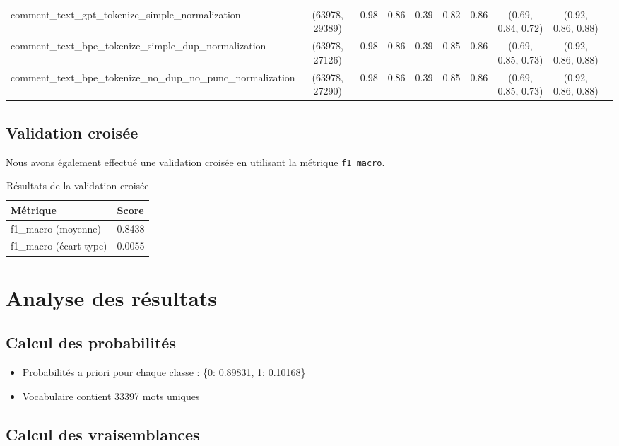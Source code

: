 \begin{table}[htbp]
{\begin{tabular}{@{}lccccccccc@{}}
    comment\_text\_gpt\_tokenize\_simple\_normalization & (63978, 29389) & 0.98 & 0.86 & 0.39 & 0.82 & 0.86 & (0.69, 0.84, 0.72) & (0.92, 0.86, 0.88) \\
    comment\_text\_bpe\_tokenize\_simple\_dup\_normalization & (63978, 27126) & 0.98 & 0.86 & 0.39 & 0.85 & 0.86 & (0.69, 0.85, 0.73) & (0.92, 0.86, 0.88) \\
    comment\_text\_bpe\_tokenize\_no\_dup\_no\_punc\_normalization & (63978, 27290) & 0.98 & 0.86 & 0.39 & 0.85 & 0.86 & (0.69, 0.85, 0.73) & (0.92, 0.86, 0.88) \\
    \bottomrule
    \end{tabular}%
    }
    \end{table}


\subsection{Validation croisée}

Nous avons également effectué une validation croisée en utilisant la métrique \texttt{f1\_macro}.

\begin{table}[h]
    \centering
    \begin{tabular}{|l|l|}
    \hline
    \textbf{Métrique} & \textbf{Score} \\ \hline
    f1\_macro (moyenne) & 0.8438 \\ \hline
    f1\_macro (écart type) & 0.0055 \\ \hline
    \end{tabular}
    \caption{Résultats de la validation croisée}
\end{table}

\section{Analyse des résultats}

\subsection{Calcul des probabilités}

\begin{itemize}
    \item Probabilités a priori pour chaque classe : \{0: 0.89831, 1: 0.10168\}
    \item Vocabulaire contient 33397 mots uniques
\end{itemize}

\subsection{Calcul des vraisemblances}

